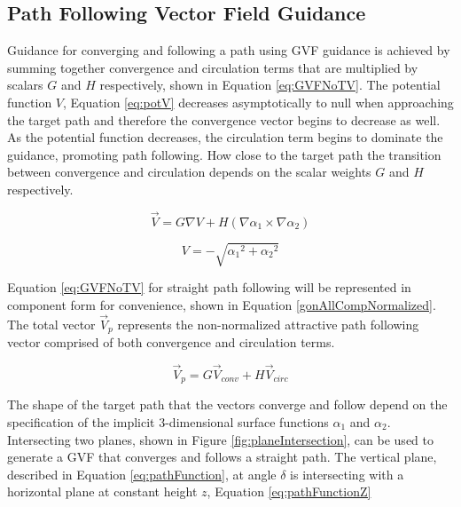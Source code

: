 \documentclass[numbered,pdftex]{ohio-etd}
\begin{document}
\subsection{Path Following Vector Field Guidance}
Guidance for converging and following a path using GVF guidance is achieved by summing together convergence and circulation terms that are multiplied by scalars $G$ and $H$ respectively, shown in Equation \ref{eq:GVFNoTV}. The potential function $V$, Equation \ref{eq:potV} decreases asymptotically to null when approaching the target path and therefore the convergence vector begins to decrease as well. As the potential function decreases, the circulation term begins to dominate the guidance, promoting path following. How close to the target path the transition between convergence and circulation depends on the scalar weights $G$ and $H$ respectively. 


\begin{equation}\label{eq:GVFNoTV}
\overrightarrow{V} = G \nabla V + H(\nabla\alpha_1 \times \nabla\alpha_2)
\end{equation}

\begin{equation}
V = -\sqrt{{\alpha_1}^2 + {\alpha_2}^2}
\label{eq:potV}
\end{equation}



Equation \ref{eq:GVFNoTV} for straight path following will be represented in component form for convenience, shown in Equation \ref{gonAllCompNormalized}. The total vector $\overrightarrow{V}_p$ represents the non-normalized attractive path following vector comprised of both convergence and circulation terms. 

\begin{equation}
\overrightarrow{V}_{p} = G \overrightarrow{V}_{conv} +H\overrightarrow{V}_{circ}
\label{gonAllCompNormalized}
\end{equation}

The shape of the target path that the vectors converge and follow depend on the specification of the implicit 3-dimensional surface functions $\alpha_1$ and $\alpha_2$. Intersecting two planes, shown in Figure \ref{fig:planeIntersection}, can be used to generate a GVF that converges and follows a straight path. The vertical plane, described in Equation \ref{eq:pathFunction}, at angle $\delta$ is intersecting with a horizontal plane at constant height $z$, Equation \ref{eq:pathFunctionZ}
\end{document}
